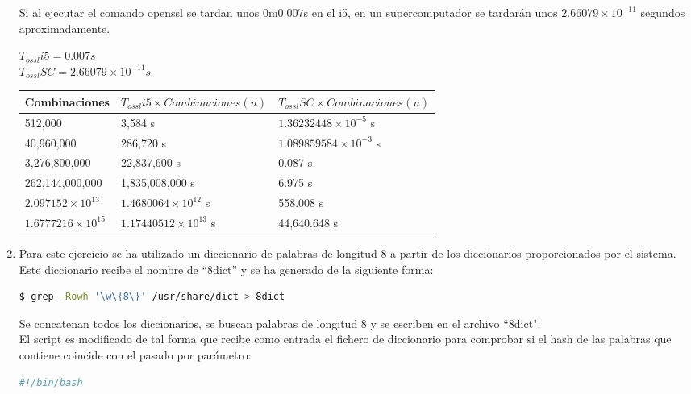 \documentclass[10pt,a4paper]{article}
\begin{document}
\begin{enumerate}[label=\alph*]
Si al ejecutar el comando openssl se tardan unos 0m0{.}007s en el i5, en un supercomputador se tardarán unos $2{.}66079 \times 10^{-11}$ segundos aproximadamente.

\begin{center}
$T_{ossl}i5 = 0{.}007s$\\
$T_{ossl}SC = 2{.}66079 \times 10^{-11}s$
\end{center}


\begin{table}[h!]
  \begin{tabular}{ | l | l | l | }
    \hline
      Combinaciones  & $T_{ossl}i5 \times Combinaciones(n) $ & $T_{ossl}SC \times Combinaciones(n)$ \\ \hline
        512,000  & 3,584 s & $1{.}36232448\times10^{-5}$ s\\ \hline
        40,960,000 & 286,720 s & $1{.}089859584\times10^{-3}$ s\\ \hline
        3,276,800,000 & 22,837,600 s & 0{.}087 s \\ \hline
        262,144,000,000 & 1,835,008,000 s & 6{.}975 s\\ \hline
        $2{.}097152\times10^{13}$ & $1{.}4680064\times10^{12}$ s & 558{.}008 s\\ \hline
        $1{.}6777216\times10^{15}$ & $1{.}17440512\times10^{13}$ s & 44,640{.}648 s\\ \hline
  \end{tabular}
\end{table}

\item Para este ejercicio se ha utilizado un diccionario de palabras de longitud 8 a partir de los diccionarios proporcionados por el sistema. Este diccionario recibe el nombre de ``8dict'' y se ha generado de la siguiente forma:\\

\begin{lstlisting}[language=bash]
$ grep -Rowh '\w\{8\}' /usr/share/dict > 8dict
\end{lstlisting}
Se concatenan todos los diccionarios, se buscan palabras de longitud 8 y se escriben en el archivo ``8dict".\\

El script es modificado de tal forma que recibe como entrada el fichero de diccionario para comprobar si el hash de las palabras que contiene coincide con el pasado por parámetro:
\begin{lstlisting}[language=bash]
#!/bin/bash


\end{lstlisting}
\end{enumerate}
\end{document}
